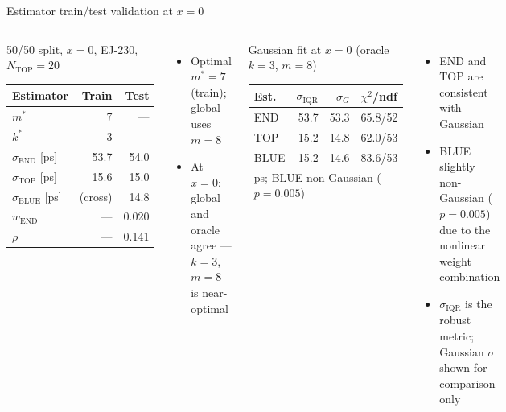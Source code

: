 \documentclass[aspectratio=169,9pt]{beamer}
\newcommand{\sIQR}{\sigma_{\mathrm{IQR}}}
\newcommand{\sEnd}{\sigma_{\mathrm{END}}}
\newcommand{\sTop}{\sigma_{\mathrm{TOP}}}
\newcommand{\sBlu}{\sigma_{\mathrm{BLUE}}}
\newcommand{\Ntop}{N_{\mathrm{TOP}}}
\begin{document}
\begin{frame}{Estimator train/test validation at $x=0$}
\begin{columns}[c]
\begin{block}{50/50 split, $x=0$, EJ-230, $\Ntop=20$}
\small
\begin{tabular}{lrr}
\toprule
Estimator & Train & Test \\
\midrule
$m^*$       & 7      & —     \\
$k^*$       & 3      & —     \\
$\sEnd$ [ps] & 53.7  & 54.0  \\
$\sTop$ [ps] & 15.6  & 15.0  \\
$\sBlu$ [ps] & (cross) & 14.8\\
$w_{\mathrm{END}}$ & — & 0.020 \\
$\rho$      & — & 0.141 \\
\bottomrule
\end{tabular}
\end{block}
\begin{itemize}\setlength\itemsep{3pt}
  \item Optimal $m^*=7$ (train); global uses $m=8$
  \item At $x=0$: global and oracle agree —
    $k=3$, $m=8$ is near-optimal
\end{itemize}
\begin{block}{Gaussian fit at $x=0$ (oracle $k=3$, $m=8$)}
\small
\begin{tabular}{lrrl}
\toprule
Est. & $\sIQR$ & $\sigma_G$ & $\chi^2$/ndf \\
\midrule
END  & 53.7 & 53.3 & 65.8/52 \\
TOP  & 15.2 & 14.8 & 62.0/53 \\
BLUE & 15.2 & 14.6 & 83.6/53 \\
\bottomrule
\multicolumn{4}{l}{\scriptsize ps; BLUE non-Gaussian ($p=0.005$)}
\end{tabular}
\end{block}
\begin{itemize}\setlength\itemsep{3pt}
  \item END and TOP are consistent with Gaussian
  \item BLUE slightly non-Gaussian ($p=0.005$)
    due to the nonlinear weight combination
  \item $\sIQR$ is the robust metric; Gaussian
    $\sigma$ shown for comparison only
\end{itemize}
\end{columns}
\end{frame}
\end{document}
